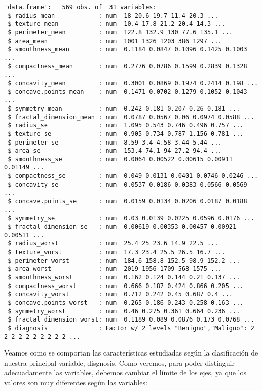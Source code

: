 \documentclass[
]{article}
\begin{document}
\begin{verbatim}
'data.frame':   569 obs. of  31 variables:
 $ radius_mean            : num  18 20.6 19.7 11.4 20.3 ...
 $ texture_mean           : num  10.4 17.8 21.2 20.4 14.3 ...
 $ perimeter_mean         : num  122.8 132.9 130 77.6 135.1 ...
 $ area_mean              : num  1001 1326 1203 386 1297 ...
 $ smoothness_mean        : num  0.1184 0.0847 0.1096 0.1425 0.1003 ...
 $ compactness_mean       : num  0.2776 0.0786 0.1599 0.2839 0.1328 ...
 $ concavity_mean         : num  0.3001 0.0869 0.1974 0.2414 0.198 ...
 $ concave.points_mean    : num  0.1471 0.0702 0.1279 0.1052 0.1043 ...
 $ symmetry_mean          : num  0.242 0.181 0.207 0.26 0.181 ...
 $ fractal_dimension_mean : num  0.0787 0.0567 0.06 0.0974 0.0588 ...
 $ radius_se              : num  1.095 0.543 0.746 0.496 0.757 ...
 $ texture_se             : num  0.905 0.734 0.787 1.156 0.781 ...
 $ perimeter_se           : num  8.59 3.4 4.58 3.44 5.44 ...
 $ area_se                : num  153.4 74.1 94 27.2 94.4 ...
 $ smoothness_se          : num  0.0064 0.00522 0.00615 0.00911 0.01149 ...
 $ compactness_se         : num  0.049 0.0131 0.0401 0.0746 0.0246 ...
 $ concavity_se           : num  0.0537 0.0186 0.0383 0.0566 0.0569 ...
 $ concave.points_se      : num  0.0159 0.0134 0.0206 0.0187 0.0188 ...
 $ symmetry_se            : num  0.03 0.0139 0.0225 0.0596 0.0176 ...
 $ fractal_dimension_se   : num  0.00619 0.00353 0.00457 0.00921 0.00511 ...
 $ radius_worst           : num  25.4 25 23.6 14.9 22.5 ...
 $ texture_worst          : num  17.3 23.4 25.5 26.5 16.7 ...
 $ perimeter_worst        : num  184.6 158.8 152.5 98.9 152.2 ...
 $ area_worst             : num  2019 1956 1709 568 1575 ...
 $ smoothness_worst       : num  0.162 0.124 0.144 0.21 0.137 ...
 $ compactness_worst      : num  0.666 0.187 0.424 0.866 0.205 ...
 $ concavity_worst        : num  0.712 0.242 0.45 0.687 0.4 ...
 $ concave.points_worst   : num  0.265 0.186 0.243 0.258 0.163 ...
 $ symmetry_worst         : num  0.46 0.275 0.361 0.664 0.236 ...
 $ fractal_dimension_worst: num  0.1189 0.089 0.0876 0.173 0.0768 ...
 $ diagnosis              : Factor w/ 2 levels "Benigno","Maligno": 2 2 2 2 2 2 2 2 2 2 ...
\end{verbatim}

Veamos como se comportan las características estudiadas según la
clasificación de nuestra principal variable, disgnosis. Como veremos,
para poder distinguir adecuadamente las variables, debemos cambiar el
límite de los ejes, ya que los valores son muy diferentes según las
variables:
\end{document}

